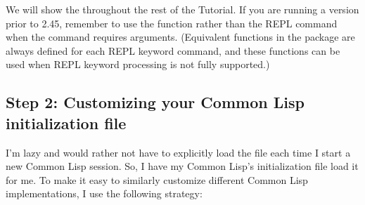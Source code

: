 \documentclass[10pt,twoside,english,pdftex]{article}
\begin{document}
We will show the 
throughout the rest of the Tutorial.  If you are running a
 version prior to 2.45, remember to
use the  function rather than the REPL command when
the command requires arguments.  (Equivalent functions in the
 package are always defined for each REPL
keyword command, and these functions can be used when REPL keyword
processing is not fully supported.)

\subsection*{Step 2: Customizing your Common Lisp initialization file}

I'm lazy and would rather not have to explicitly load the
 file each time I start a new
Common Lisp session.  So, I have my Common Lisp's initialization file load it
for me.  To make it easy to similarly customize different Common Lisp
implementations, I use the following strategy:
\end{document}
